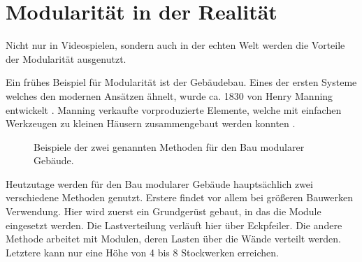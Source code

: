 \section{Modularität in der Realität}
Nicht nur in Videospielen, sondern auch in der echten Welt werden die Vorteile der Modularität ausgenutzt.
\par
Ein frühes Beispiel für Modularität ist der Gebäudebau. Eines der ersten Systeme welches den modernen Ansätzen ähnelt, wurde ca. 1830 von Henry Manning entwickelt \parencite[Abschnitt 1.1.1]{1837}. Manning verkaufte vorproduzierte Elemente, welche mit einfachen Werkzeugen zu kleinen Häusern zusammengebaut werden konnten \parencite[Abschnitt 1.1.1]{1837}.
\begin{figure}[H]
\centering
  \qquad
  \caption{Beispiele der zwei genannten Methoden für den Bau modularer Gebäude.}%
\end{figure}
\vspace{-10.5pt}
Heutzutage werden für den Bau modularer Gebäude hauptsächlich zwei verschiedene Methoden genutzt. Erstere findet vor allem bei größeren Bauwerken Verwendung. Hier wird zuerst ein Grundgerüst gebaut, in das die Module eingesetzt werden. Die Lastverteilung verläuft hier über Eckpfeiler. Die andere Methode arbeitet mit Modulen, deren Lasten über die Wände verteilt werden. Letztere kann nur eine Höhe von 4 bis 8 Stockwerken erreichen. \parencite{Lawson}
\par
